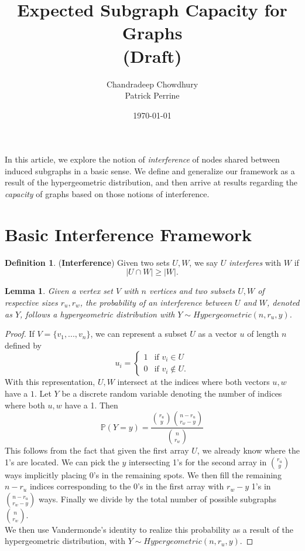 \documentclass[10pt]{extarticle}
\title{\textbf{Expected Subgraph Capacity for Graphs \\ (Draft)}}
\author{Chandradeep Chowdhury \\ Patrick Perrine}
\date{\today}
\newtheorem{lemma}[theorem]{Lemma}
\theoremstyle{definition}
\newtheorem{definition}[theorem]{Definition}
\begin{document}
 \maketitle
 
In this article, we explore the notion of \textit{interference} of nodes shared between induced subgraphs in a basic sense. We define and generalize our framework as a result of the hypergeometric distribution, and then arrive at results regarding the \textit{capacity} of graphs based on those notions of interference.

\section{Basic Interference Framework}

\begin{definition}
    (\textbf{Interference}) Given two sets $U, W$, we say $U$ \textit{interferes} with $W$ if 
    \begin{equation}
        |U \cap W| \ge |W|.
    \end{equation}
\end{definition}

\begin{lemma}
	Given a vertex set $V$ with $n$ vertices and two subsets $U,W$ of respective sizes $r_u,r_w$, the probability of an interference between $U$ and $W$, denoted as $Y$, follows a hypergeometric distribution with $Y \sim Hypergeometric(n, r_u, y)$.
\end{lemma}
\begin{proof}
	If $V = \{v_1,...,v_n\}$, we can represent a subset $U$ as a vector $u$ of length $n$ defined by
    $$
    u_i = \begin{cases}
        1 & \text{if } v_i \in U \\
        0 & \text{if } v_i \notin U.
    \end{cases}
    $$
    With this representation, $U,W$ intersect at the indices where both vectors $u, w$ have a $1$. Let $Y$ be a discrete random variable denoting the number of indices where both $u, w$ have a 1. Then 
    \begin{equation}
        \mathbb{P}(Y=y) = \frac{\binom{r_u}{y} \binom{n-r_u}{r_w-y}}{\binom{n}{r_w}}
    \end{equation}
    This follows from the fact that given the first array $U$, we already know where the 1's are located. We can pick the $y$ intersecting 1's for the second array in $\binom{r_u}{y}$ ways implicitly placing 0's in the remaining spots. We then fill the remaining $n-r_u$ indices corresponding to the 0's in the first array with $r_w-y$ 1's in $\binom{n-r_u}{r_w-y}$ ways. Finally we divide by the total number of possible subgraphs $\binom{n}{r_w}$. \\
    
\noindent We then use Vandermonde's identity to realize this probability as a result of the hypergeometric distribution, with $Y \sim Hypergeometric(n, r_u, y)$.
\end{proof}
\end{document}
